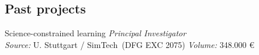 \documentclass[highlights,publist]{cvlfoc}
\begin{document}
{%
%



\subsection*{Past projects}

\begin{entrydate}
		{Science-constrained learning}
		{}
		{\emph{Principal Investigator}\\
		\emph{Source:} U. Stuttgart / SimTech~(DFG EXC 2075)
			\hfill \emph{Volume:} 348.000 \euro
			}

\end{entrydate}
}{}
\end{document}
